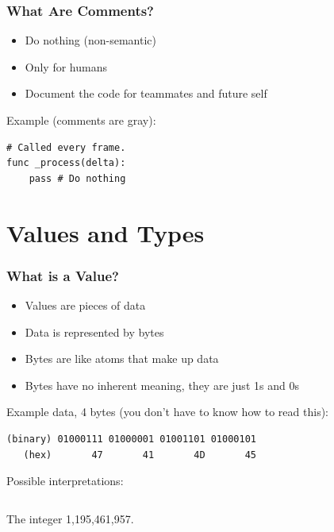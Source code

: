 \documentclass{beamer}
\newenvironment{xframe}[2][]
{
    \begin{frame}[fragile,environment=xframe,#1]
    \frametitle{#2}
}{
    \end{frame}
}
\begin{document}
\begin{xframe}{What Are Comments?}
    \begin{itemize}
        \item Do nothing (non-semantic)
        \item Only for humans
        \item Document the code for teammates and future self
    \end{itemize}

    \pause
    \bigskip

    Example (comments are gray):
    \begin{verbatim}
# Called every frame.
func _process(delta):
    pass # Do nothing
    \end{verbatim}

\end{xframe}

\section{Values and Types}

\begin{xframe}{What is a Value?}
    \begin{itemize}
        \item Values are pieces of data
        \item Data is represented by bytes
        \item Bytes are like atoms that make up data
        \item Bytes have no inherent meaning, they are just 1s and 0s
    \end{itemize}

    \pause
    \medskip

    Example data, 4 bytes (you don't have to know how to read this):
    \begin{verbatim}
(binary) 01000111 01000001 01001101 01000101
   (hex)       47       41       4D       45
    \end{verbatim}

    \pause

    Possible interpretations:

    \begin{columns}
        \begin{column}{0.33\textwidth}
            The integer 1,195,461,957.
        \end{column}
        \begin{column}{0.33\textwidth}
        \end{column}
        \begin{column}{0.33\textwidth}
        \end{column}
    \end{columns}

\end{xframe}
\end{document}
